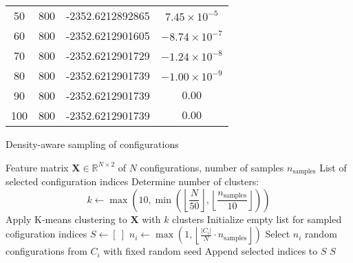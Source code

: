 \begin{table}[htbp]
\begin{tabular}{cccc}
    50 & 800 &  -2352.6212892865 & $7.45 \times 10^{-5}$ \\
    60 & 800 &  -2352.6212901605 & $-8.74 \times 10^{-7}$ \\
    70 & 800 &  -2352.6212901729 & $-1.24 \times 10^{-8}$ \\
    80 & 800 &  -2352.6212901739 & $-1.00 \times 10^{-9}$ \\
    90 & 800 &  -2352.6212901739 & $0.00$ \\
    100 & 800 &  -2352.6212901739 & $0.00$ \\
    \bottomrule
    \end{tabular}
\end{table}



\begin{algorithm}[htbp]
    \caption{Density-aware sampling of configurations}
    \label{alg:density_aware_sampling}
    \begin{algorithmic}[1]
    \Require Feature matrix $\mathbf{X} \in \mathbb{R}^{N \times 2}$ of $N$ configurations, number of samples $n_\text{samples}$
    \Ensure List of selected configuration indices
    \State Determine number of clusters:
        \[
        k \gets \max\left(10, \min\left(\left\lfloor \frac{N}{50} \right\rfloor, \left\lfloor \frac{n_\text{samples}}{10} \right\rfloor\right)\right)
        \]
    \State Apply K-means clustering to $\mathbf{X}$ with $k$ clusters
    \State Initialize empty list for sampled cofiguration indices $S \gets [\ ]$
        \State $n_i \gets \max\left(1, \left\lfloor \frac{|C_i|}{N} \cdot n_\text{samples} \right\rfloor \right)$
        \State Select $n_i$ random configurations from $C_i$ with fixed random seed
        \State Append selected indices to $S$
    \EndFor
    \State \Return $S$
    \end{algorithmic}
\end{algorithm}



